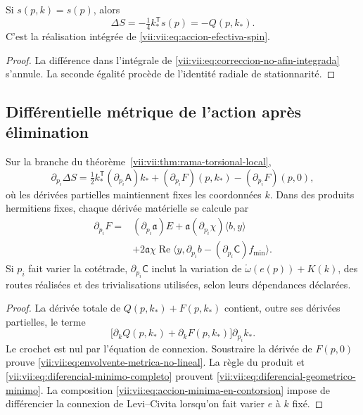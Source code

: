 \begin{corollary}
\label{vii:vii:cor:recuperacion-eliminacion-afin}
Si \(s(p,k)=s(p)\), alors
\[
 \Delta S=-\tfrac14 k_*^{\mathsf T}s(p)=-Q(p,k_*).
\]
C'est la réalisation intégrée de \eqref{vii:vii:eq:accion-efectiva-spin}.
\end{corollary}
\begin{proof}
La différence dans l'intégrale de
\eqref{vii:vii:eq:correccion-no-afin-integrada} s'annule. La seconde
égalité procède de l'identité radiale de stationnarité.
\end{proof}

\subsection{Différentielle métrique de l'action après élimination}
\label{vii:vii:subsec:diferencial-metrico-no-lineal}

\begin{theorem}
\label{vii:vii:thm:envolvente-metrica}
Sur la branche du théorème~\ref{vii:vii:thm:rama-torsional-local},
\begin{equation}
 \partial_{p_i}\Delta S
 =\tfrac12 k_*^{\mathsf T}(\partial_{p_i}\mathsf A)k_*
  +(\partial_{p_i}F)(p,k_*)-(\partial_{p_i}F)(p,0),
 \label{vii:vii:eq:envolvente-metrica-no-lineal}
\end{equation}
où les dérivées partielles maintiennent fixes les coordonnées \(k\).
Dans des produits hermitiens fixes, chaque dérivée matérielle se calcule par
\begin{equation}
 \begin{split}
 \partial_{p_i}F={}&(\partial_{p_i}\mathfrak a)E
       +\mathfrak a(\partial_{p_i}\chi)\langle b,y\rangle\\
   &+2\mathfrak a\chi\operatorname{Re}
       \langle y,\partial_{p_i}b
                    -(\partial_{p_i}\mathsf C)f_{\min}\rangle.
 \end{split}
 \label{vii:vii:eq:diferencial-geometrico-minimo}
\end{equation}
Si \(p_i\) fait varier la cotétrade, \(\partial_{p_i}\mathsf C\) inclut la variation de \(\mathring\omega(e(p))+K(k)\), des routes réalisées et des trivialisations utilisées, selon leurs dépendances déclarées.
\end{theorem}

\begin{proof}
La dérivée totale de \(Q(p,k_*)+F(p,k_*)\) contient, outre
ses dérivées partielles, le terme
\[
 \bigl[\partial_kQ(p,k_*)+\partial_kF(p,k_*)\bigr]
                      \partial_{p_i}k_*.
\]
Le crochet est nul par l'équation de connexion. Soustraire la dérivée
de \(F(p,0)\) prouve
\eqref{vii:vii:eq:envolvente-metrica-no-lineal}.
La règle du produit et
\eqref{vii:vii:eq:diferencial-minimo-completo} prouvent
\eqref{vii:vii:eq:diferencial-geometrico-minimo}. La composition
\eqref{vii:vii:eq:accion-minima-en-contorsion} impose de différencier
la connexion de Levi--Civita lorsqu'on fait varier \(e\) à \(k\) fixé.
\end{proof}

